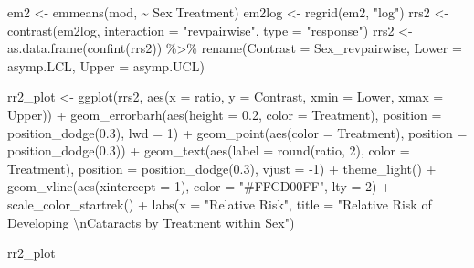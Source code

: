 \documentclass[
]{article}
\newenvironment{Shaded}{\begin{snugshade}}{\end{snugshade}}
\newcommand{\AttributeTok}[1]{\textcolor[rgb]{0.77,0.63,0.00}{#1}}
\newcommand{\DecValTok}[1]{\textcolor[rgb]{0.00,0.00,0.81}{#1}}
\newcommand{\FloatTok}[1]{\textcolor[rgb]{0.00,0.00,0.81}{#1}}
\newcommand{\FunctionTok}[1]{\textcolor[rgb]{0.00,0.00,0.00}{#1}}
\newcommand{\NormalTok}[1]{#1}
\newcommand{\OtherTok}[1]{\textcolor[rgb]{0.56,0.35,0.01}{#1}}
\newcommand{\SpecialCharTok}[1]{\textcolor[rgb]{0.00,0.00,0.00}{#1}}
\newcommand{\StringTok}[1]{\textcolor[rgb]{0.31,0.60,0.02}{#1}}
\begin{document}
\begin{Shaded}
\begin{Highlighting}[]
\NormalTok{em2 }\OtherTok{\textless{}{-}} \FunctionTok{emmeans}\NormalTok{(mod, }\SpecialCharTok{\textasciitilde{}}\NormalTok{ Sex}\SpecialCharTok{|}\NormalTok{Treatment)}
\NormalTok{em2log }\OtherTok{\textless{}{-}} \FunctionTok{regrid}\NormalTok{(em2, }\StringTok{"log"}\NormalTok{)}
\NormalTok{rrs2 }\OtherTok{\textless{}{-}} \FunctionTok{contrast}\NormalTok{(em2log, }\AttributeTok{interaction =} \StringTok{"revpairwise"}\NormalTok{, }\AttributeTok{type =} \StringTok{"response"}\NormalTok{)}
\NormalTok{rrs2 }\OtherTok{\textless{}{-}} \FunctionTok{as.data.frame}\NormalTok{(}\FunctionTok{confint}\NormalTok{(rrs2)) }\SpecialCharTok{\%\textgreater{}\%}
  \FunctionTok{rename}\NormalTok{(}\AttributeTok{Contrast =}\NormalTok{ Sex\_revpairwise, }\AttributeTok{Lower =}\NormalTok{ asymp.LCL, }\AttributeTok{Upper =}\NormalTok{ asymp.UCL)}

\NormalTok{rr2\_plot }\OtherTok{\textless{}{-}} \FunctionTok{ggplot}\NormalTok{(rrs2, }\FunctionTok{aes}\NormalTok{(}\AttributeTok{x =}\NormalTok{ ratio, }\AttributeTok{y =}\NormalTok{ Contrast, }\AttributeTok{xmin =}\NormalTok{ Lower, }\AttributeTok{xmax =}\NormalTok{ Upper)) }\SpecialCharTok{+}
  \FunctionTok{geom\_errorbarh}\NormalTok{(}\FunctionTok{aes}\NormalTok{(}\AttributeTok{height =} \FloatTok{0.2}\NormalTok{, }\AttributeTok{color =}\NormalTok{ Treatment),}
                 \AttributeTok{position =} \FunctionTok{position\_dodge}\NormalTok{(}\FloatTok{0.3}\NormalTok{), }\AttributeTok{lwd =} \DecValTok{1}\NormalTok{) }\SpecialCharTok{+}
  \FunctionTok{geom\_point}\NormalTok{(}\FunctionTok{aes}\NormalTok{(}\AttributeTok{color =}\NormalTok{ Treatment), }\AttributeTok{position =} \FunctionTok{position\_dodge}\NormalTok{(}\FloatTok{0.3}\NormalTok{)) }\SpecialCharTok{+}
  \FunctionTok{geom\_text}\NormalTok{(}\FunctionTok{aes}\NormalTok{(}\AttributeTok{label =} \FunctionTok{round}\NormalTok{(ratio, }\DecValTok{2}\NormalTok{), }\AttributeTok{color =}\NormalTok{ Treatment), }
            \AttributeTok{position =} \FunctionTok{position\_dodge}\NormalTok{(}\FloatTok{0.3}\NormalTok{), }\AttributeTok{vjust =} \SpecialCharTok{{-}}\DecValTok{1}\NormalTok{) }\SpecialCharTok{+}
  \FunctionTok{theme\_light}\NormalTok{() }\SpecialCharTok{+}
  \FunctionTok{geom\_vline}\NormalTok{(}\FunctionTok{aes}\NormalTok{(}\AttributeTok{xintercept =} \DecValTok{1}\NormalTok{), }\AttributeTok{color =} \StringTok{"\#FFCD00FF"}\NormalTok{, }\AttributeTok{lty =} \DecValTok{2}\NormalTok{) }\SpecialCharTok{+}
  \FunctionTok{scale\_color\_startrek}\NormalTok{() }\SpecialCharTok{+}
  \FunctionTok{labs}\NormalTok{(}\AttributeTok{x =} \StringTok{"Relative Risk"}\NormalTok{,}
       \AttributeTok{title =} \StringTok{"Relative Risk of Developing }\SpecialCharTok{\textbackslash{}n}\StringTok{Cataracts by Treatment within Sex"}\NormalTok{)}

\NormalTok{rr2\_plot}
\end{Highlighting}
\end{Shaded}
\end{document}
